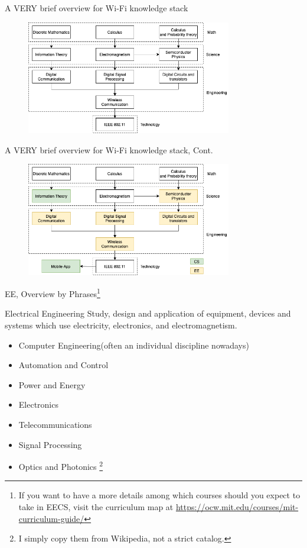 \documentclass[aspectratio=169, 12pt]{beamer}
\begin{document}
\begin{frame}{A VERY brief overview for Wi-Fi knowledge stack}
    \begin{figure}
        \centering
        \includegraphics[width=0.8\textwidth]{assets/wifi.png}
        \label{fig:wifi}
    \end{figure}
\end{frame}

\begin{frame}{A VERY brief overview for Wi-Fi knowledge stack, Cont.}
    \begin{figure}
        \centering
        \includegraphics[width=0.8\textwidth]{assets/wifi_2.png}
        \label{fig:wifi2}
    \end{figure}
\end{frame}

\begin{frame}{EE, Overview by Phrases\footnote{\tiny If you want to have a more details among which courses should you expect to take in EECS, visit the curriculum map at \url{https://ocw.mit.edu/courses/mit-curriculum-guide/}}}
\begin{block}{Electrical Engineering}
Study, design and application of equipment, devices and systems which use electricity, electronics, and electromagnetism.
\end{block}
\begin{itemize}
\scriptsize
\item Computer Engineering(often an individual discipline nowadays)
\item Automation and Control
\item Power and Energy
\item Electronics
\item Telecommunications
\item Signal Processing
\item Optics and Photonics
\footnote{\tiny I simply copy them from Wikipedia, not a strict catalog.}
\end{itemize}
\end{frame}
\end{document}
